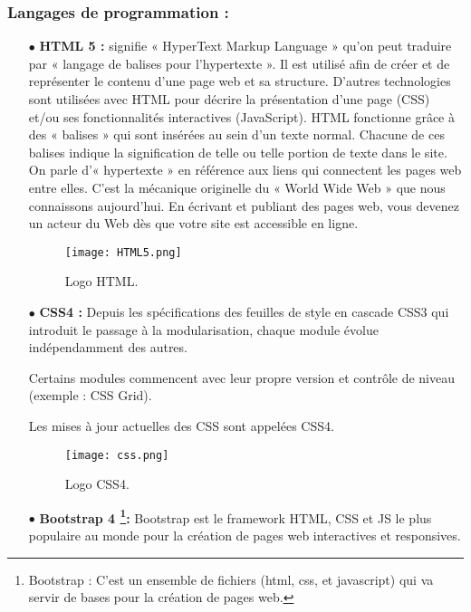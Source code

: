 \subsubsection{Langages de programmation :}

\begin{itemize}
	\item[$\bullet$] \textbf{HTML 5 :} 	
 signifie « HyperText Markup Language » qu’on peut traduire par « langage de
balises pour l’hypertexte ». Il est utilisé afin de créer et de représenter le contenu d’une
page web et sa structure. D’autres technologies sont utilisées avec HTML pour décrire la
présentation d’une page (CSS) et/ou ses fonctionnalités interactives (JavaScript).
HTML fonctionne grâce à des « balises » qui sont insérées au sein d’un texte normal.
Chacune de ces balises indique la signification de telle ou telle portion de texte dans
le site. On parle d’« hypertexte » en référence aux liens qui connectent les pages web
entre elles. C’est la mécanique originelle du « World Wide Web » que nous connaissons
aujourd’hui. En écrivant et publiant des pages web, vous devenez un acteur du Web dès
que votre site est accessible en ligne.\cite{wiki:Hypertext_Markup_Language}
	\begin{figure}[ht]
		\centering
		\texttt{[image: HTML5.png]}
		\caption{Logo HTML.}
		\label{fig:HTML5 }
	\end{figure}
	\FloatBarrier	
	\medskip
	

		\item[$\bullet$] \textbf{CSS4 :} 
Depuis les spécifications des feuilles de style en cascade CSS3 qui introduit le passage à la modularisation, chaque module évolue indépendamment des autres.

Certains modules commencent avec leur propre version et contrôle de niveau (exemple : CSS Grid).

Les mises à jour actuelles des CSS sont appelées CSS4.\cite{wiki:Feuilles_de_style_en_cascade}
		\begin{figure}[ht]
			\centering
			\texttt{[image: css.png]}
			\caption{Logo CSS4.}
			\label{fig:CSS4 }
		\end{figure}
		\FloatBarrier
		
		\medskip
		
		
	\item[$\bullet$] \textbf{Bootstrap 4 \footnote{Bootstrap : C’est un ensemble de fichiers (html, css, et javascript) qui va servir de bases pour la création de pages web.}:} 
Bootstrap est le framework HTML, CSS et JS le plus populaire au monde pour la création de pages web interactives et responsives.


\end{itemize}
